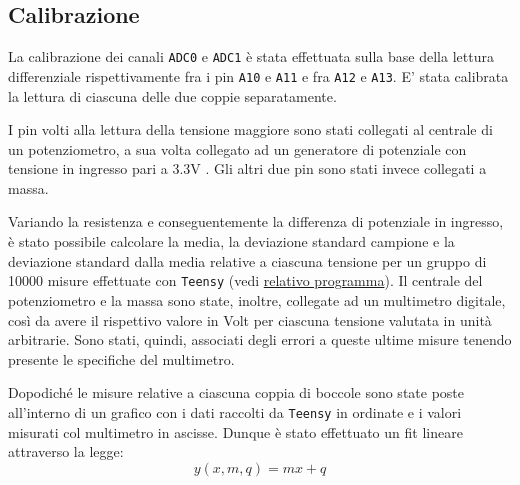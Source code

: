 \documentclass{article}[a4paper, oneside, 11pt]
\begin{document}
\subsection{Calibrazione}\label{sec: cal}

La calibrazione dei canali \verb+ADC0+ e \verb+ADC1+ è stata effettuata
sulla base della lettura differenziale rispettivamente fra i pin \verb+A10+
e \verb+A11+ e fra \verb+A12+ e \verb+A13+. E’ stata calibrata la lettura
di ciascuna delle due coppie separatamente.

I pin volti alla lettura della tensione maggiore sono stati collegati al 
centrale di un potenziometro, a sua volta collegato ad un generatore di 
potenziale con tensione in ingresso pari a 3.3V . Gli altri due pin sono stati 
invece collegati a massa.

Variando la resistenza e conseguentemente la differenza di potenziale in 
ingresso, è stato possibile calcolare la media, la deviazione standard 
campione e la deviazione standard dalla media relative a ciascuna tensione per 
un gruppo di 10000 misure effettuate con \verb+Teensy+ (vedi 
\href{https://github.com/LucaCiucci/relaz_seme/blob/master/sketches/teensy_calib/teensy_calib.ino}{relativo programma}).
Il centrale del potenziometro e la 
massa sono state, inoltre, collegate ad un multimetro digitale, così da avere 
il rispettivo valore in Volt per ciascuna tensione valutata in unità 
arbitrarie. Sono stati, quindi, associati degli errori a queste ultime misure  
tenendo presente le specifiche del multimetro.

Dopodiché le misure relative a ciascuna coppia di boccole sono state poste 
all’interno di un grafico con i dati raccolti da \verb+Teensy+ in ordinate e i 
valori misurati col multimetro in ascisse. Dunque è stato effettuato un fit 
lineare attraverso la legge:
\begin{equation}
y(x, m, q)  = m x + q
\end{equation}
\end{document}
